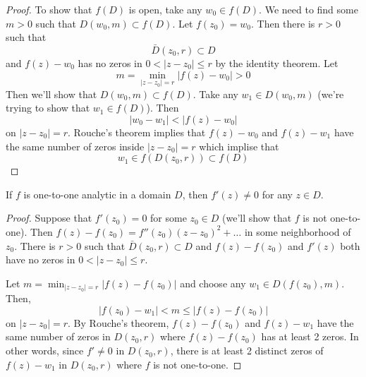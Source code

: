 \vspace{2ex}
\begin{proof}
To show that $f(D)$ is open, take any $w_0\in f(D)$. We need to find some $m>0$ such that $D(w_0,m)\subset f(D)$. Let $f(z_0)=w_0$. Then there is $r>0$ such that
\[\bar{D}(z_0,r)\subset D\]
and $f(z)-w_0$ has no zeros in $0<|z-z_0|\leq r$ by the identity theorem. Let
\[m=\min _{|z-z_0|=r }|f(z)-w_0|>0\]
Then we'll show that $D(w_0,m)\subset f(D)$. Take any $w_1\in D(w_0,m)$ (we're trying to show that $w_1\in f(D)$). Then
\[|w_0-w_1|<|f(z)-w_0|\]
on $|z-z_0|=r$. Rouche's theorem implies that $f(z)-w_0$ and $f(z)-w_1$ have the same number of zeros inside $|z-z_0|=r$ which implise that
\[w_1\in f(D(z_0,r))\subset f(D)\]
\end{proof}
\vspace{2ex}
\begin{thm}
If $f$ is one-to-one analytic in a domain $D$, then $f'(z)\ne 0$ for any $z\in D$. 
\end{thm}
\vspace{2ex}
\begin{proof}
Suppose that $f'(z_0)=0$ for some $z_0\in D$ (we'll show that $f$ is not one-to-one). Then $f(z)-f(z_0)=f''(z_0)(z-z_0)^2+\ldots $ in some neighborhood of $z_0$. There is $r>0$ such that $\bar{D}(z_0,r)\subset D$ and $f(z)-f(z_0)$ and $f'(z)$ both have no zeros in $0<|z-z_0|\leq r$.

\bigskip

Let $m=\min_{|z-z_0|=r}|f(z)-f(z_0)|$ and choose any $w_1\in D(f(z_0),m)$. Then,
\[|f(z_0)-w_1|<m\leq |f(z)-f(z_0)|\]
on $|z-z_0|=r$. By Rouche's theorem, $f(z)-f(z_0)$ and $f(z)-w_1$ have the same number of zeros in $D(z_0,r)$ where $f(z)-f(z_0)$ has at least 2 zeros. In other words, since $f'\ne 0$ in $D(z_0,r)$, there is at least 2 distinct zeros of $f(z)-w_1$ in $D(z_0,r)$ where $f$ is not one-to-one.
\end{proof}
\vspace{2ex}

